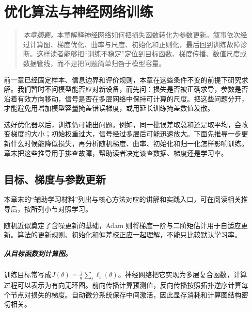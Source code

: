﻿\chapter{优化算法与神经网络训练}

\begin{quote}\small
\textit{本章摘要。}本章解释神经网络如何把损失函数转化为参数更新。叙事依次经过计算图、梯度优化、曲率与尺度、初始化和正则化，最后回到训练故障诊断。这样读者能够把“训练不稳定”定位到目标函数、梯度传播、数值尺度或数据管线，而不是把问题简单归咎于模型容量。
\end{quote}

前一章已经固定样本、信息边界和评价规则，本章在这些条件不变的前提下研究求解。我们暂时不问模型能否应对新设备，而先问：损失是否被正确求导，参数是否沿着有效方向移动，信号是否在多层网络中保持可计算的尺度。把这些问题分开，才能避免用增加模型容量掩盖错误梯度，或用延长训练掩盖数值发散。

选好优化器以后，训练仍可能出问题。例如，同一批误差取总和还是取平均，会改变梯度的大小；初始权重过大，信号经过多层后可能迅速放大。下面先推导一步更新什么时候能降低损失，再分析随机梯度、曲率、初始化和归一化怎样影响训练。章末把这些推导用于排查故障，帮助读者决定该查数据、梯度还是学习率。

\section{目标、梯度与参数更新}

本章末的“辅助学习材料”列出与核心方法对应的讲解和实践入口，可在阅读相关推导后，按所列小节对照学习。

随机近似奠定了含噪更新的基础，Adam 则将梯度一阶与二阶矩估计用于自适应更新\cite{robbins1951stochastic,kingma2015adam}。算法的更新规则、初始化和偏差校正应一起理解，不能只比较默认学习率。
\paragraph{从目标函数到计算图。}
训练目标常写成$J(\theta)=\frac1n\sum_i\ell_i(\theta)$。神经网络把它实现为多层复合函数，计算过程可以表示为有向无环图。前向传播计算预测值，反向传播按照拓扑逆序计算每个节点对损失的梯度。自动微分系统保存中间激活，因此显存消耗和计算图结构密切相关。

